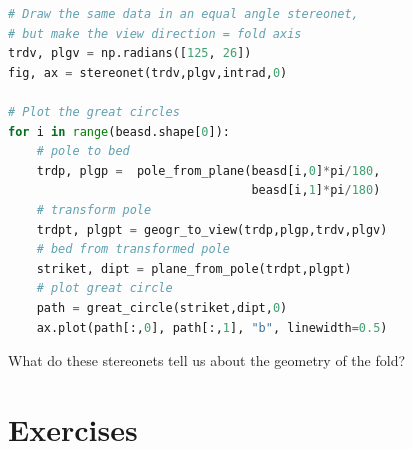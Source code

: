 \documentclass[a4paper , 12pt]{book}
\begin{document}
\begin{center}
\begin{lstlisting}[language=Python, frame=single]
# Draw the same data in an equal angle stereonet,
# but make the view direction = fold axis
trdv, plgv = np.radians([125, 26]) 
fig, ax = stereonet(trdv,plgv,intrad,0)

# Plot the great circles
for i in range(beasd.shape[0]):
    # pole to bed
    trdp, plgp =  pole_from_plane(beasd[i,0]*pi/180,
                                  beasd[i,1]*pi/180)
    # transform pole
    trdpt, plgpt = geogr_to_view(trdp,plgp,trdv,plgv)
    # bed from transformed pole
    striket, dipt = plane_from_pole(trdpt,plgpt)
    # plot great circle
    path = great_circle(striket,dipt,0)
    ax.plot(path[:,0], path[:,1], "b", linewidth=0.5) 
\end{lstlisting}
\end{center}

What do these stereonets tell us about the geometry of the fold?

\section{Exercises}
\end{document}

